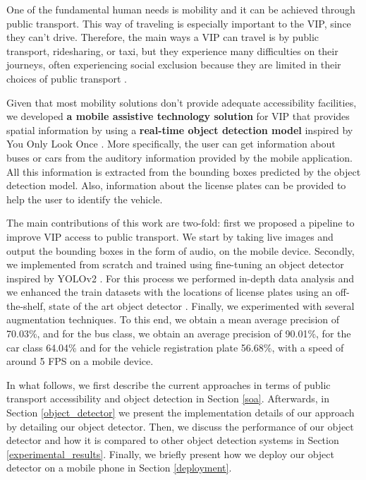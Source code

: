 One of the fundamental human needs is mobility and it can be achieved through public transport. This way of traveling is especially important to the VIP, since they can't drive. Therefore, the main ways a VIP can travel is by public transport, ridesharing, or taxi, but they experience many difficulties on their journeys, often experiencing social exclusion because they are limited in their choices of public transport \cite{vipExperienceOnPT}. 
        
Given that most mobility solutions don't provide adequate accessibility facilities, we developed \textbf{a mobile assistive technology solution} for VIP that provides spatial information by using a \textbf{real-time object detection model} inspired by You Only Look Once \cite{yolo}. More specifically, the user can get information about buses or cars from the auditory information provided by the mobile application. All this information is extracted from the bounding boxes predicted by the object detection model. Also, information about the license plates can be provided to help the user to identify the vehicle.


The main contributions of this work are two-fold: first we proposed a pipeline to improve VIP access to public transport. We start by taking live images and output the bounding boxes in the form of audio, on the mobile device. Secondly, we implemented from scratch and trained using fine-tuning an object detector inspired by YOLOv2 \cite{yolov2}. For this process we performed in-depth data analysis and we enhanced the train datasets with the locations of license plates using an off-the-shelf, state of the art object detector \cite{license_plate_enhancer}. Finally, we experimented with several augmentation techniques. To this end, we obtain a mean average precision of 70.03\%, and for the bus class, we obtain an average precision of 90.01\%, for the car class 64.04\% and for the vehicle registration plate 56.68\%, with a speed of around 5 FPS on a mobile device.


In what follows, we first describe the current approaches in terms of public transport accessibility and object detection in Section \ref{soa}. Afterwards, in Section \ref{object_detector} we present the implementation details of our approach by detailing our object detector. Then, we discuss the performance of our object detector and how it is compared to other object detection systems in Section \ref{experimental_results}. Finally, we briefly present how we deploy our object detector on a mobile phone in Section \ref{deployment}. 